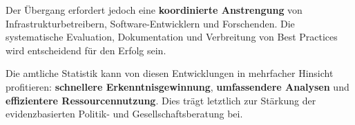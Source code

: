 \documentclass[
  ngerman,
  10pt,
  twocolumn]{article}
\begin{document}
Der Übergang erfordert jedoch eine \textbf{koordinierte Anstrengung} von
Infrastrukturbetreibern, Software-Entwicklern und Forschenden. Die
systematische Evaluation, Dokumentation und Verbreitung von Best
Practices wird entscheidend für den Erfolg sein.

Die amtliche Statistik kann von diesen Entwicklungen in mehrfacher
Hinsicht profitieren: \textbf{schnellere Erkenntnisgewinnung},
\textbf{umfassendere Analysen} und \textbf{effizientere
Ressourcennutzung}. Dies trägt letztlich zur Stärkung der
evidenzbasierten Politik- und Gesellschaftsberatung bei.


\printbibliography
\end{document}
